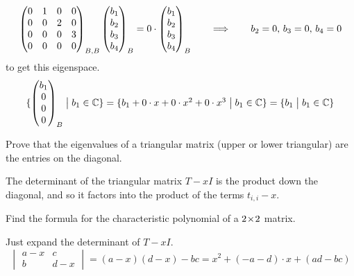 \begin{exercises}
\begin{answer}
\begin{equation*}
         \begin{pmatrix}
           0  &1  &0  &0  \\
           0  &0  &2  &0  \\
           0  &0  &0  &3  \\
           0  &0  &0  &0
         \end{pmatrix}_{B,B}
         \begin{pmatrix} b_1 \\ b_2 \\ b_3 \\ b_4 \end{pmatrix}_B
         =0\cdot\begin{pmatrix} b_1 \\ b_2 \\ b_3 \\ b_4 \end{pmatrix}_B
         \qquad\Longrightarrow\qquad
         \text{$b_2=0$, $b_3=0$, $b_4=0$}          
       \end{equation*}
       to get this eigenspace.
       \begin{equation*}
         \mbox{$\{\begin{pmatrix} b_1 \\ 0 \\ 0 \\ 0 \end{pmatrix}_B
               \bigm| b_1\in\mathbb{C}\}$}
         =\mbox{$\{b_1+0\cdot x+0\cdot x^2+0\cdot x^3
               \bigm| b_1\in\mathbb{C}\}$}
         =\mbox{$\{b_1
               \bigm| b_1\in\mathbb{C}\}$}
       \end{equation*}
      \end{answer}
   \item Prove that 
     the eigenvalues of a triangular matrix  (upper or lower triangular)
     are the entries on the diagonal.
     \begin{answer}
       The determinant of the triangular matrix $T-xI$ is the product 
       down the diagonal, and so it factors into the product of 
       the terms $t_{i,i}-x$.
     \end{answer}
  \recommended \item 
    Find the formula for the characteristic polynomial of a $2 \! \times \! 2$
    matrix.
    \begin{answer}
      Just expand the determinant of $T-xI$.
      \begin{equation*}
        \begin{vmatrix}
          a-x  &c  \\
          b    &d-x
        \end{vmatrix}
        =(a-x)(d-x)-bc
        =x^2+(-a-d)\cdot x +(ad-bc)
      \end{equation*}
    \end{answer}
  \item \label{exer:CharPolyTransWellDefed}

\end{exercises}

